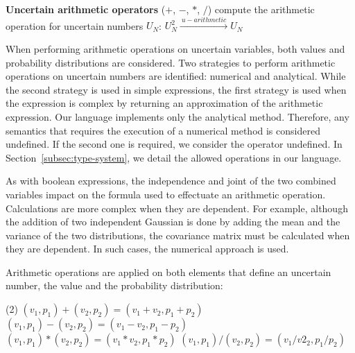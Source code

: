 \bigskip

\begin{operator}
    \label{op:arithmetic}
    \textbf{Uncertain arithmetic operators} ($+$, $-$, $*$, $/$) compute the arithmetic operation for uncertain numbers $U_N$: $U_N^2 \xrightarrow{~u-arithmetic~} U_N$
\end{operator}
When performing arithmetic operations on uncertain variables, both values and probability distributions are considered.
Two strategies to perform arithmetic operations on uncertain numbers are identified: numerical and analytical.
While the second strategy is used in simple expressions, the first strategy is used when the expression is complex by returning an approximation of the arithmetic expression. 
Our language implements only the analytical method.
Therefore, any semantics that requires the execution of a numerical method is considered undefined.
If the second one is required, we consider the operator undefined.
In Section~\ref{subsec:type-system}, we detail the allowed operations in our language.

As with boolean expressions, the independence and joint of the two combined variables impact on the formula used to effectuate an arithmetic operation.
Calculations are more complex when they are dependent.
For example, although the addition of two independent Gaussian is done by adding the mean and the variance of the two distributions, the covariance matrix must be calculated when they are dependent.
In such cases, the numerical approach is used.

Arithmetic operations are applied on both elements that define an uncertain number, the value and the probability distribution:

\begin{tasks}[label={\ }, after-item-skip=-1mm, before-skip={0mm}](2)
	\task $(v_1,p_1) + (v_2,p_2) = (v_1 + v_2, p_1 + p_2)$	
	\task $(v_1,p_1) - (v_2,p_2) = (v_1 - v_2, p_1 - p_2)$
	\task $(v_1,p_1) * (v_2,p_2) = (v_1 * v_2, p_1 * p_2)$
	\task $(v_1,p_1) / (v_2,p_2) = (v_1 / v2_2, p_1 / p_2)$
\end{tasks}


